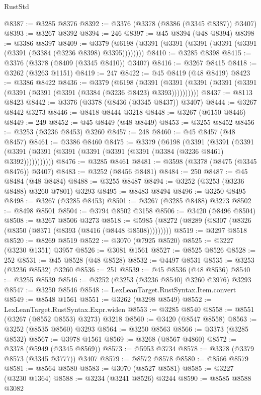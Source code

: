 \begin{lexlean}{RustStd}
\begin{coremodule}
@8387 := @3285 @8376
@8392 := @3376 (@3378 (@8386 (@3345 @8387)) @3407)
@8393 := @3267 @8392
@8394 := 246
@8397 := @45 @8394 (@48 @8394)
@8398 := @3386 @8397
@8409 := @3379 (@6198 (@3391 (@3391 (@3391 (@3391 (@3391 (@3391 (@3384 (@3236 @8398) @3395))))))))
@8410 := @3285 @8398
@8415 := @3376 (@3378 (@8409 (@3345 @8410)) @3407)
@8416 := @3267 @8415
@8418 := @3262 (@3263 @1151)
@8419 := 247
@8422 := @45 @8419 (@48 @8419)
@8423 := @3386 @8422
@8436 := @3379
    (@6198
      (@3391 (@3391 (@3391 (@3391 (@3391 (@3391 (@3391 (@3391 (@3384 (@3236 @8423) @3393))))))))))
@8437 := @8113 @8423
@8442 := @3376 (@3378 (@8436 (@3345 @8437)) @3407)
@8444 := @3267 @8442 @3273
@8446 := @8418 @8444 @3218
@8448 := @3267 (@6150 @8446)
@8449 := 249
@8452 := @45 @8449 (@48 @8449)
@8453 := @3255 @8452
@8456 := @3253 (@3236 @8453) @3260
@8457 := 248
@8460 := @45 @8457 (@48 @8457)
@8461 := @3386 @8460
@8475 := @3379
    (@6198
      (@3391
        (@3391
          (@3391 (@3391 (@3391 (@3391 (@3391 (@3391 (@3391 (@3384 (@3236 @8461) @3392)))))))))))
@8476 := @3285 @8461
@8481 := @3598 (@3378 (@8475 (@3345 @8476)) @3407)
@8483 := @3252 (@8456 @8481)
@8484 := 250
@8487 := @45 @8484 (@48 @8484)
@8488 := @3255 @8487
@8494 := @3252 (@3253 (@3236 @8488) @3260 @7801) @3293
@8495 := @8483 @8494
@8496 := @3250 @8495
@8498 := @3267 (@3285 @8453)
@8501 := @3267 (@3285 @8488) @3273
@8502 := @8498 @8501
@8504 := @3794 @8502 @3158
@8506 := @3420 (@8496 @8504)
@8508 := @3267 @8506 @3273
@8518 := @5985 (@8272 (@8289 (@8307 (@8326 (@8350 (@8371 (@8393 (@8416 (@8448 @8508)))))))))
@8519 := @3297 @8518
@8520 := @8269 @8519
@8522 := @3070 (@7925 @8520)
@8525 := @3227 (@3230 @1351) @3957
@8526 := @3081 @1561
@8527 := @8525 @8526
@8528 := 252
@8531 := @45 @8528 (@48 @8528)
@8532 := @4497 @8531
@8535 := @3253 (@3236 @8532) @3260
@8536 := 251
@8539 := @45 @8536 (@48 @8536)
@8540 := @3255 @8539
@8546 := @3252 (@3253 (@3236 @8540) @3260 @3976) @3293
@8547 := @3250 @8546
@8548 := LexLeanTarget.RustSyntax.Item.convert
@8549 := @8548 @1561
@8551 := @3262 (@3298 @8549)
@8552 := LexLeanTarget.RustSyntax.Expr.widen
@8553 := @3285 @8540
@8558 := @8551 (@3267 (@8552 @8553) @3273) @3218
@8560 := @3420 (@8547 @8558)
@8563 := @3252 (@8535 @8560) @3293
@8564 := @3250 @8563
@8566 := @3373 (@3285 @8532)
@8567 := @3978 @1561
@8569 := @3268 (@8567 @4860)
@8572 := @3378 (@5949 (@3345 @8569))
@8573 := @5953 @3734
@8578 := @3378 (@3379 @8573 (@3345 @3777)) @3407
@8579 := @8572 @8578
@8580 := @8566 @8579
@8581 := @8564 @8580
@8583 := @3070 (@8527 @8581)
@8585 := @3227 (@3230 @1364)
@8588 := @3234 (@3241 @8526) @3244
@8590 := @8585 @8588 @3082

\end{coremodule}
\end{lexlean}
